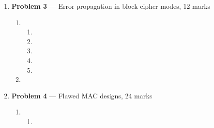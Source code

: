 \documentclass[11pt]{article}
\theoremstyle{definition}
\begin{document}
\begin{enumerate}
	\begin{enumerate}
	
		\item %
		
		\item %
		
		\begin{enumerate}
			\item %
			
			\item %
		\end{enumerate}
		
		\item %
		
		\begin{enumerate}
			\item %
			
			\item %
		\end{enumerate}
	\end{enumerate}
	
	
	\item[] \textbf{Problem 3} --- Error propagation in block cipher modes, 12 marks
	
	\begin{enumerate}
		\item %
		
		\begin{enumerate}
			\item %
			
			\item %
			
			\item %
			
			\item %
			
			\item %
		
		\end{enumerate}
		
		\item %
	
	\end{enumerate}
	
	
	\item[] \textbf{Problem 4} --- Flawed MAC designs, 24 marks
	
	\begin{enumerate}
	
		\item %
		
		\begin{enumerate}
			\item %
			

\end{enumerate}
\end{enumerate}
\end{enumerate}
\end{document}
